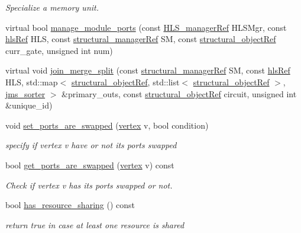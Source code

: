 \begin{DoxyCompactItemize}
\begin{DoxyCompactList}\small\item\em Specialize a memory unit. \end{DoxyCompactList}\item 
virtual bool \hyperlink{classfu__binding_a22ec0ba3bb337532e0fca26e2625085e}{manage\+\_\+module\+\_\+ports} (const \hyperlink{hls__manager_8hpp_acd3842b8589fe52c08fc0b2fcc813bfe}{H\+L\+S\+\_\+manager\+Ref} H\+L\+S\+Mgr, const \hyperlink{hls_8hpp_a75d0c73923d0ddfa28c4843a802c73a7}{hls\+Ref} H\+LS, const \hyperlink{structural__manager_8hpp_ab3136f0e785d8535f8d252a7b53db5b5}{structural\+\_\+manager\+Ref} SM, const \hyperlink{structural__objects_8hpp_a8ea5f8cc50ab8f4c31e2751074ff60b2}{structural\+\_\+object\+Ref} curr\+\_\+gate, unsigned int num)
\item 
virtual void \hyperlink{classfu__binding_a7f20518e1518f5ad76bd1cce7cc010eb}{join\+\_\+merge\+\_\+split} (const \hyperlink{structural__manager_8hpp_ab3136f0e785d8535f8d252a7b53db5b5}{structural\+\_\+manager\+Ref} SM, const \hyperlink{hls_8hpp_a75d0c73923d0ddfa28c4843a802c73a7}{hls\+Ref} H\+LS, std\+::map$<$ \hyperlink{structural__objects_8hpp_a8ea5f8cc50ab8f4c31e2751074ff60b2}{structural\+\_\+object\+Ref}, std\+::list$<$ \hyperlink{structural__objects_8hpp_a8ea5f8cc50ab8f4c31e2751074ff60b2}{structural\+\_\+object\+Ref} $>$, \hyperlink{structjms__sorter}{jms\+\_\+sorter} $>$ \&primary\+\_\+outs, const \hyperlink{structural__objects_8hpp_a8ea5f8cc50ab8f4c31e2751074ff60b2}{structural\+\_\+object\+Ref} circuit, unsigned int \&unique\+\_\+id)
\item 
void \hyperlink{classfu__binding_a04518ec079c3447b876a609b8d3ae288}{set\+\_\+ports\+\_\+are\+\_\+swapped} (\hyperlink{graph_8hpp_abefdcf0544e601805af44eca032cca14}{vertex} v, bool condition)
\begin{DoxyCompactList}\small\item\em specify if vertex v have or not its ports swapped \end{DoxyCompactList}\item 
bool \hyperlink{classfu__binding_a025a171ca9de5dbd653047a66cdae181}{get\+\_\+ports\+\_\+are\+\_\+swapped} (\hyperlink{graph_8hpp_abefdcf0544e601805af44eca032cca14}{vertex} v) const
\begin{DoxyCompactList}\small\item\em Check if vertex v has its ports swapped or not. \end{DoxyCompactList}\item 
bool \hyperlink{classfu__binding_a9af2939915377be1e45fcd905efc512b}{has\+\_\+resource\+\_\+sharing} () const
\begin{DoxyCompactList}\small\item\em return true in case at least one resource is shared \end{DoxyCompactList}\end{DoxyCompactItemize}
